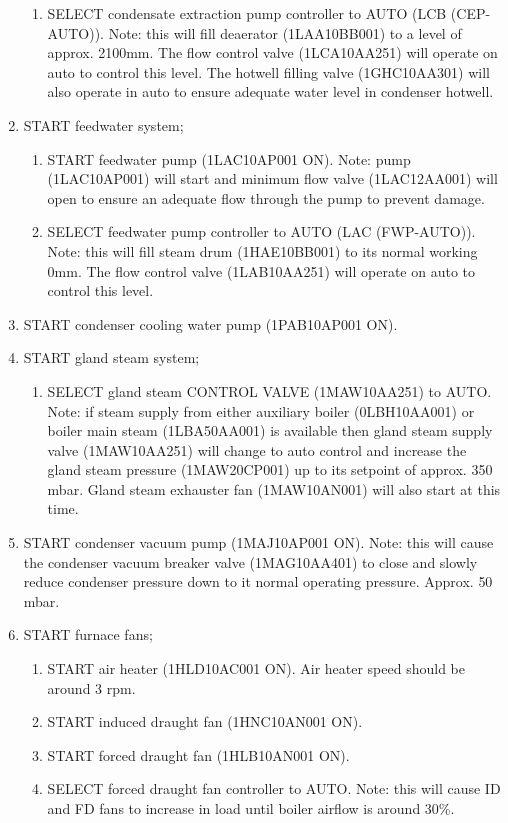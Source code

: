 \documentclass[10pt,a4paper]{article}
\begin{document}
\begin{enumerate}
\begin{enumerate}
\item SELECT condensate extraction pump controller to AUTO (LCB (CEP-AUTO)). Note: this will fill deaerator (1LAA10BB001) to a level of approx. 2100mm. The flow control valve (1LCA10AA251) will operate on auto to control this level. The hotwell filling valve (1GHC10AA301) will also operate in auto to ensure adequate water level in condenser hotwell.
\end{enumerate}
\item START feedwater system;
\begin{enumerate}
\item START feedwater pump (1LAC10AP001 ON). Note: pump (1LAC10AP001) will start and minimum flow valve (1LAC12AA001) will open to ensure an adequate flow through the pump to prevent damage.
\item SELECT feedwater pump controller to AUTO (LAC (FWP-AUTO)). Note: this will fill steam drum (1HAE10BB001) to its normal working 0mm. The flow control valve (1LAB10AA251) will operate on auto to control this level. 
\end{enumerate}

\item START condenser cooling water pump (1PAB10AP001 ON).
\item START gland steam system;
\begin{enumerate}
\item SELECT gland steam CONTROL VALVE (1MAW10AA251) to AUTO. Note: if steam supply from either auxiliary boiler (0LBH10AA001) or boiler main steam (1LBA50AA001) is available then gland steam supply valve (1MAW10AA251) will change to auto control and increase the gland steam pressure (1MAW20CP001) up to its setpoint of approx. 350 mbar. Gland steam exhauster fan (1MAW10AN001) will also start at this time.
\end{enumerate}

\item START condenser vacuum pump (1MAJ10AP001 ON). Note: this will cause the condenser vacuum breaker valve (1MAG10AA401) to close and slowly reduce condenser pressure down to it normal operating pressure. Approx. 50 mbar.
\item START furnace fans;
\begin{enumerate}
\item START air heater (1HLD10AC001 ON). Air heater speed should be around 3 rpm.
\item START induced draught fan (1HNC10AN001 ON).
\item START forced draught fan (1HLB10AN001 ON).
\item SELECT forced draught fan controller to AUTO. Note: this will cause ID and FD fans to increase in load until boiler airflow is around 30\%.
\end{enumerate}


\end{enumerate}
\end{document}
